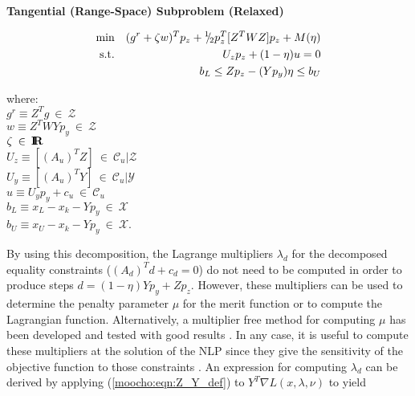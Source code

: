 \documentclass[pdf,ps2pdf,11pt]{SANDreport}
\begin{document}
{{\begin{center}\textbf{Tangential (Range-Space) Subproblem (Relaxed)}\end{center}
\begin{eqnarray}
\mbox{min}  &  & (g^r + \zeta w)^T p_z + {}^1 \!\! / \! {}_2 p_z^T [Z^T W Z] p_z + M(\eta)
                 \label{moocho:eqn:rsqp:obj} \\
\mbox{s.t.} &  & U_z p_z + (1-\eta) u = 0 
                 \label{moocho:eqn:rsqp:equ} \\
            &  & b_L \leq Z p_z - (Y p_y) \eta \leq b_U	
                 \label{moocho:eqn:rsqp:inequ}
\end{eqnarray}
\begin{tabbing}
\hspace{4ex}where:\hspace{5ex}\= \\
\>	$g^r \equiv Z^T g \:\in\:\mathcal{Z}$ \\
\>	$w \equiv Z^T W Y p_y \:\in\:\mathcal{Z}$ \\
\>	$\zeta \:\in\:\mbox{\textbf{I}}\hspace{-0.6ex}\mbox{\textbf{R}}$ \\
\>	$U_z \equiv [(A_u)^T Z] \:\in\:\mathcal{C}_u|\mathcal{Z}$ \\
\>	$U_y \equiv [(A_u)^T Y] \:\in\:\mathcal{C}_u|\mathcal{Y}$ \\
\>  $u   \equiv U_y p_y + c_u \:\in\:\mathcal{C}_u$ \\
\>	$b_L \equiv x_L - x_k - Y p_y \:\in\:\mathcal{X}$ \\
\>	$b_U \equiv x_U - x_k - Y p_y \:\in\:\mathcal{X}$.
\end{tabbing}
\esinglespace}

By using this decomposition, the Lagrange multipliers $\lambda_d$ for
the decomposed equality constraints ($(A_d)^T d + c_d = 0$) do not
need to be computed in order to produce steps $d = (1-\eta) Y p_y + Z
p_z$.  However, these multipliers can be used to determine the penalty
parameter $\mu$ for the merit function \cite[page
544]{ref:nocedal_wright_1999} or to compute the Lagrangian function.
Alternatively, a multiplier free method for computing $\mu$ has been
developed and tested with good results \cite{ref:schmid_rsqp_1994}.
In any case, it is useful to compute these multipliers at the solution
of the NLP since they give the sensitivity of the objective function
to those constraints \cite[page 436]{ref:nash_sofer_1996}.  An
expression for computing $\lambda_d$ can be derived by applying
(\ref{moocho:eqn:Z_Y_def}) to $Y^T \nabla L(x,\lambda,\nu)$ to yield

}
\end{document}

